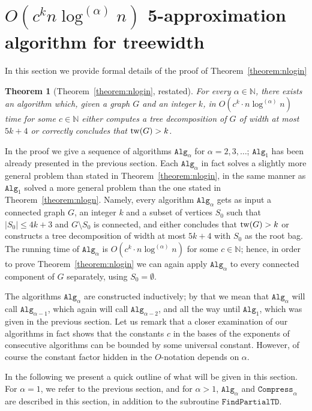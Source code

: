 \documentclass[a4paper,11pt]{article}
\newtheorem{theorem}{Theorem}
\theoremstyle{definition}
\theoremstyle{remark}
\newcommand{\depth}{\alpha}
\newcommand{\findPTD}{\mathtt{FindPartialTD}}
\newcommand{\compress}[1]{\mathtt{Compress}_{#1}}
\newcommand{\alg}[1]{\mathtt{Alg}_{#1}}
\begin{document}
\newcommand{\forg}{\texttt{forgotten}}

\section{$O(c^k n \log^{(\depth)} n)$ 5-approximation algorithm for
  treewidth}
\label{section:logi}

In this section we provide formal details of the proof of
Theorem~\ref{theorem:nlogin}
\begin{theorem}[Theorem~\ref{theorem:nlogin}, restated]
  For every $\depth\in \mathbb{N}$, there exists an algorithm which,
  given a graph $G$ and an integer $k$, in $O(c^k\cdot n
  \log^{(\depth)} n)$ time for some $c \in \mathbb{N}$ either computes
  a tree decomposition of $G$ of width at most $5k+4$ or correctly
  concludes that $\mathrm{tw}(G) > k$.
\end{theorem}

In the proof we give a sequence of algorithms $\alg{\depth}$ for
$\depth=2,3,\ldots$; $\alg{1}$ has been already presented in the
previous section.  Each $\alg{\depth}$ in fact solves a slightly more
general problem than stated in Theorem~\ref{theorem:nlogin}, in the
same manner as $\alg{1}$ solved a more general problem than the one
stated in Theorem~\ref{theorem:nlogn}.  Namely, every algorithm
$\alg{\depth}$ gets as input a connected graph $G$, an integer $k$ and
a subset of vertices $S_0$ such that $|S_0|\leq 4k+3$ and $G\setminus
S_0$ is connected, and either concludes that $\mathrm{tw}(G)>k$ or constructs
a tree decomposition of width at most $5k+4$ with $S_0$ as the root
bag.  The running time of $\alg{\depth}$ is $O(c^k\cdot n
\log^{(\depth)} n)$ for some $c \in \mathbb{N}$; hence, in order to
prove Theorem~\ref{theorem:nlogin} we can again apply $\alg{\depth}$
to every connected component of $G$ separately, using $S_0=\emptyset$.

The algorithms $\alg{\depth}$ are constructed inductively; by that we
mean that $\alg{\depth}$ will call $\alg{\depth-1}$, which again will
call $\alg{\depth-2}$, and all the way until $\alg{1}$, which was
given in the previous section.  Let us remark that a closer
examination of our algorithms in fact shows that the constants $c$ in
the bases of the exponents of consecutive algorithms can be bounded by
some universal constant.  However, of course the constant factor
hidden in the $O$-notation depends on $\depth$.

In the following we present a quick outline of what will be given in
this section.  For $\depth = 1$, we refer to the previous section, and
for $\depth > 1$, $\alg{\depth}$ and $\compress{\depth}$ are described
in this section, in addition to the subroutine $\findPTD$.
\end{document}
